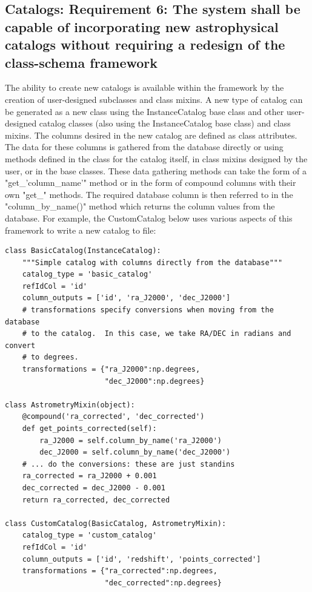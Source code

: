 \documentclass[]{article}
\begin{document}
{\subsection{Catalogs: Requirement 6: The system shall be capable of incorporating new astrophysical catalogs without requiring
a redesign of the class-schema framework}
The ability to create new catalogs is available within the framework by the creation of user-designed subclasses and class mixins. A new type of catalog can be generated as a new class using the InstanceCatalog base class and other user-designed catalog classes (also using the InstanceCatalog base class) and class mixins. The columns desired in the new catalog are defined as class attributes. The data for these columns is gathered from the database directly or using methods defined in the class
for the catalog itself, in class mixins designed by the user, or in the base classes. These data gathering methods can take the form of a "get\_'column\_name'" method or in the form of compound columns with their own "get\_" methods. The required database column is then referred to in the "column\_by\_name()" method which returns the column values from the database. For example, the CustomCatalog below uses various aspects of this framework to write a new catalog to file:

\begin{verbatim}
class BasicCatalog(InstanceCatalog):
    """Simple catalog with columns directly from the database"""
    catalog_type = 'basic_catalog'
    refIdCol = 'id'
    column_outputs = ['id', 'ra_J2000', 'dec_J2000']
    # transformations specify conversions when moving from the database
    # to the catalog.  In this case, we take RA/DEC in radians and convert
    # to degrees.
    transformations = {"ra_J2000":np.degrees,
                       "dec_J2000":np.degrees}

class AstrometryMixin(object):
    @compound('ra_corrected', 'dec_corrected')
    def get_points_corrected(self):
        ra_J2000 = self.column_by_name('ra_J2000')
        dec_J2000 = self.column_by_name('dec_J2000')
    # ... do the conversions: these are just standins
    ra_corrected = ra_J2000 + 0.001
    dec_corrected = dec_J2000 - 0.001
    return ra_corrected, dec_corrected

class CustomCatalog(BasicCatalog, AstrometryMixin):
    catalog_type = 'custom_catalog'
    refIdCol = 'id'
    column_outputs = ['id', 'redshift', 'points_corrected']
    transformations = {"ra_corrected":np.degrees,
                       "dec_corrected":np.degrees}


\end{verbatim}}
\end{document}
